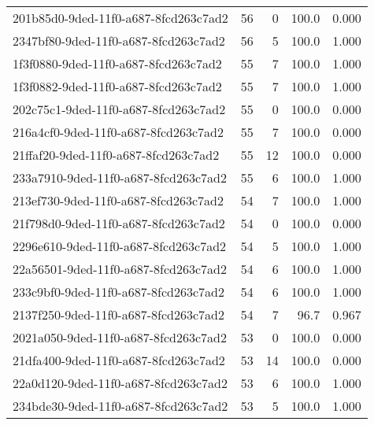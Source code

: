 \begin{longtable}{l r r r r}
201b85d0-9ded-11f0-a687-8fcd263c7ad2 & 56 & 0 & 100.0 & 0.000 \\

2347bf80-9ded-11f0-a687-8fcd263c7ad2 & 56 & 5 & 100.0 & 1.000 \\

1f3f0880-9ded-11f0-a687-8fcd263c7ad2 & 55 & 7 & 100.0 & 1.000 \\

1f3f0882-9ded-11f0-a687-8fcd263c7ad2 & 55 & 7 & 100.0 & 1.000 \\

202c75c1-9ded-11f0-a687-8fcd263c7ad2 & 55 & 0 & 100.0 & 0.000 \\

216a4cf0-9ded-11f0-a687-8fcd263c7ad2 & 55 & 7 & 100.0 & 0.000 \\

21ffaf20-9ded-11f0-a687-8fcd263c7ad2 & 55 & 12 & 100.0 & 0.000 \\

233a7910-9ded-11f0-a687-8fcd263c7ad2 & 55 & 6 & 100.0 & 1.000 \\

213ef730-9ded-11f0-a687-8fcd263c7ad2 & 54 & 7 & 100.0 & 1.000 \\

21f798d0-9ded-11f0-a687-8fcd263c7ad2 & 54 & 0 & 100.0 & 0.000 \\

2296e610-9ded-11f0-a687-8fcd263c7ad2 & 54 & 5 & 100.0 & 1.000 \\

22a56501-9ded-11f0-a687-8fcd263c7ad2 & 54 & 6 & 100.0 & 1.000 \\

233c9bf0-9ded-11f0-a687-8fcd263c7ad2 & 54 & 6 & 100.0 & 1.000 \\

2137f250-9ded-11f0-a687-8fcd263c7ad2 & 54 & 7 & 96.7 & 0.967 \\

2021a050-9ded-11f0-a687-8fcd263c7ad2 & 53 & 0 & 100.0 & 0.000 \\

21dfa400-9ded-11f0-a687-8fcd263c7ad2 & 53 & 14 & 100.0 & 0.000 \\

22a0d120-9ded-11f0-a687-8fcd263c7ad2 & 53 & 6 & 100.0 & 1.000 \\

234bde30-9ded-11f0-a687-8fcd263c7ad2 & 53 & 5 & 100.0 & 1.000 \\


\end{longtable}
